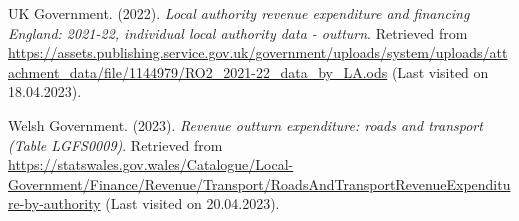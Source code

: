 \documentclass[
  12pt,
]{article}
\newlength{\cslhangindent}
\newlength{\cslentryspacingunit} %
\newenvironment{CSLReferences}[2] %
 {%
  \setlength{\parindent}{0pt}
  \ifodd #1
  \let\oldpar\par
  \def\par{\hangindent=\cslhangindent\oldpar}
  \fi
  \setlength{\parskip}{#2\cslentryspacingunit}
 }%
 {}
\begin{document}
\begin{CSLReferences}{1}{0}
\leavevmode{}%
UK Government. (2022). \emph{{Local authority revenue expenditure and financing England: 2021-22, individual local authority data - outturn}}. Retrieved from \url{https://assets.publishing.service.gov.uk/government/uploads/system/uploads/attachment_data/file/1144979/RO2_2021-22_data_by_LA.ods} (Last visited on 18.04.2023).

\leavevmode{}%
Welsh Government. (2023). \emph{{Revenue outturn expenditure: roads and transport (Table LGFS0009)}}. Retrieved from \url{https://statswales.gov.wales/Catalogue/Local-Government/Finance/Revenue/Transport/RoadsAndTransportRevenueExpenditure-by-authority} (Last visited on 20.04.2023).

\end{CSLReferences}
\end{document}
